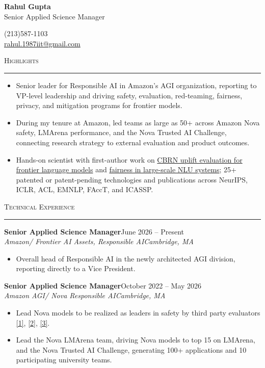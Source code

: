 \documentclass[11pt]{article}
\newcommand{\sectionheading}[1]{%
  \vspace{8pt}%
  {\large\scshape #1}\par\vspace{1pt}\hrule\vspace{3pt}%
}
\newcommand{\resumeentry}[5]{%
  \textbf{#1}\hfill #2\\
  \textit{#3}\hfill \textit{#4}
  \begin{itemize}
    #5
  \end{itemize}
  \vspace{2pt}
}
\newcommand{\socialicons}{%
  \href{https://www.linkedin.com/in/rahul-gupta-16139818}{\textcolor[HTML]{0077B5}{\Large\faLinkedin}}%
  \hspace{0.55em}%
  \href{https://scholar.google.com/citations?user=gSTLsFcAAAAJ}{\textcolor[HTML]{4285F4}{\Large\aiGoogleScholarSquare}}%
}
\begin{document}
\begin{center}
  {\LARGE\bfseries Rahul Gupta}\\[4pt]
  {\large Senior Applied Science Manager}
\end{center}

\vspace{12pt}

\begin{minipage}[t]{0.48\textwidth}
  (213)587-1103\\
  \href{mailto:rahul.1987iit@gmail.com}{rahul.1987iit@gmail.com}
\end{minipage}
\hfill
\begin{minipage}[t]{0.48\textwidth}
  \raggedleft
  \socialicons
\end{minipage}

\sectionheading{Highlights}
\begin{itemize}
  \item Senior leader for Responsible AI in Amazon's AGI organization, reporting to VP-level leadership and driving safety, evaluation, red-teaming, fairness, privacy, and mitigation programs for frontier models.
  \item During my tenure at Amazon, led teams as large as 50+ across Amazon Nova safety, LMArena performance, and the Nova Trusted AI Challenge, connecting research strategy to external evaluation and product outcomes.
  \item Hands-on scientist with first-author work on \href{https://arxiv.org/abs/2607.12200}{CBRN uplift evaluation for frontier language models} and \href{https://dl.acm.org/doi/abs/10.1145/3539597.3575785}{fairness in large-scale NLU systems}; 25+ patented or patent-pending technologies and publications across NeurIPS, ICLR, ACL, EMNLP, FAccT, and ICASSP.
\end{itemize}

\sectionheading{Technical Experience}

\resumeentry
  {Senior Applied Science Manager}
  {June 2026 -- Present}
  {Amazon/ Frontier AI Assets, Responsible AI}
  {Cambridge, MA}
  {\item Overall head of Responsible AI in the newly architected AGI division, reporting directly to a Vice President.}

\resumeentry
  {Senior Applied Science Manager}
  {October 2022 -- May 2026}
  {Amazon AGI/ Nova Responsible AI}
  {Cambridge, MA}
  {\item Lead Nova models to be realized as leaders in safety by third party evaluators \href{https://www.openpr.com/news/3785920/anthropic-amazon-lead-the-way-in-ai-safety-for-frontier-models}{[1]}, \href{https://medium.com/aymara-ai/the-aymara-llm-risk-responsibility-matrix-5a243fcf7e38}{[2]}, \href{https://www.amazon.science/blog/independent-evaluations-demonstrate-nova-premiers-safety}{[3]}.
   \item Lead the Nova LMArena team, driving Nova models to top 15 on LMArena, and the Nova Trusted AI Challenge, generating 100+ applications and 10 participating university teams.}
\end{document}
